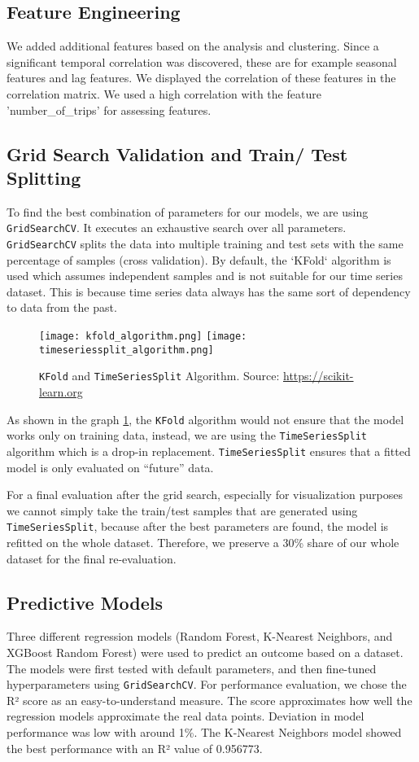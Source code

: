 \subsection{Feature Engineering}
We added additional features based on the analysis and clustering. Since a significant temporal correlation was discovered, these are for example seasonal features and lag features. We displayed the correlation of these features in the correlation matrix. We used a high correlation with the feature 'number\_of\_trips' for assessing features. 

\subsection{Grid Search Validation and Train/ Test Splitting}
To find the best combination of parameters for our models, we are using \texttt{GridSearchCV}.  It executes an exhaustive search over all parameters. \texttt{GridSearchCV} splits the data into multiple training and test sets with the same percentage of samples (cross validation). By default, the `KFold` algorithm is used which assumes independent samples and is not suitable for our time series dataset. This is because time series data always has the same sort of dependency to data from the past.

\begin{figure}[hbtp]
    \texttt{[image: kfold\_algorithm.png]}
    \hfill
    \texttt{[image: timeseriessplit\_algorithm.png]}
    \caption{\texttt{KFold} and \texttt{TimeSeriesSplit} Algorithm. Source: \url{https://scikit-learn.org}}
    \label{fig:cv}
\end{figure}
 
As shown in the graph \ref{fig:cv}, the \texttt{KFold} algorithm would not ensure that the model works only on training data, instead, we are using the \texttt{TimeSeriesSplit} algorithm which is a drop-in replacement. \texttt{TimeSeriesSplit} ensures that a fitted model is only evaluated on \enquote{future} data.

For a final evaluation after the grid search, especially for visualization purposes we cannot simply take the train/test samples that are generated using \texttt{TimeSeriesSplit}, because after the best parameters are found, the model is refitted on the whole dataset. Therefore, we preserve a 30\% share of our whole dataset for the final re-evaluation.

\subsection{Predictive Models}
Three different regression models (Random Forest, K-Nearest Neighbors, and XGBoost Random Forest) were used to predict an outcome based on a dataset. The models were first tested with default parameters, and then fine-tuned hyperparameters using \texttt{GridSearchCV}. For performance evaluation, we chose the R² score as an easy-to-understand measure. The score approximates how well the regression models approximate the real data points. Deviation in model performance was low with around 1\%. The K-Nearest Neighbors model showed the best performance with an R² value of 0.956773. 


